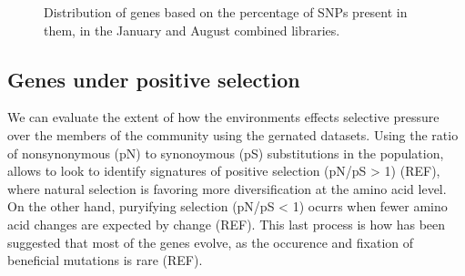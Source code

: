 \begin{figure}[h]
\centering
{}
    \hfill
{}
    \caption{Distribution of genes based on the percentage of SNPs present in them, in the January and August combined libraries.}
    \label{SNPs_Boxplot}
\end{figure}


\clearpage
\subsection{Genes under positive selection}

We can evaluate the extent of how the environments effects selective pressure over the members of the community using the gernated datasets. Using the ratio of nonsynonymous (pN) to synonoymous (pS) substitutions in the population, allows to look to identify signatures of positive selection (pN/pS > 1) (REF), where natural selection is favoring more diversification at the amino acid level. On the other hand, puryifying selection (pN/pS < 1) ocurrs when fewer amino acid changes are expected by change (REF). This last process is how has been suggested that most of the genes evolve, as the occurence and fixation of beneficial mutations is rare (REF).

